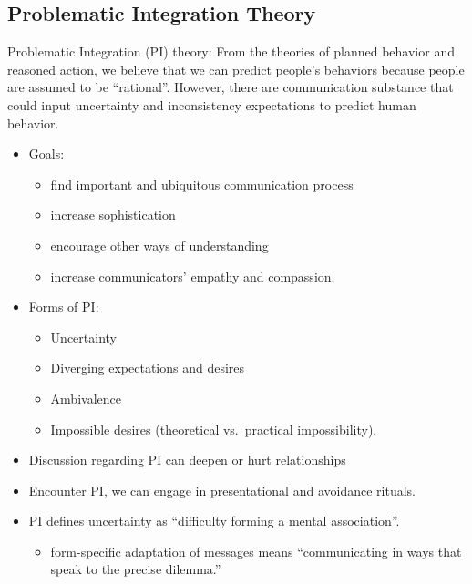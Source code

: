 \documentclass[
]{book}
\providecommand{\tightlist}{%
  \setlength{\itemsep}{0pt}\setlength{\parskip}{0pt}}
\begin{document}
\hypertarget{problematic-integration-theory}{%
\subsection{Problematic Integration Theory}\label{problematic-integration-theory}}

Problematic Integration (PI) theory: From the theories of planned behavior and reasoned action, we believe that we can predict people's behaviors because people are assumed to be ``rational''. However, there are communication substance that could input uncertainty and inconsistency expectations to predict human behavior.

\begin{itemize}
\item
  Goals:

  \begin{itemize}
  \tightlist
  \item
    find important and ubiquitous communication process\\
  \item
    increase sophistication\\
  \item
    encourage other ways of understanding\\
  \item
    increase communicators' empathy and compassion.\\
  \end{itemize}
\item
  Forms of PI:

  \begin{itemize}
  \tightlist
  \item
    Uncertainty\\
  \item
    Diverging expectations and desires\\
  \item
    Ambivalence\\
  \item
    Impossible desires (theoretical vs.~practical impossibility).\\
  \end{itemize}
\item
  Discussion regarding PI can deepen or hurt relationships\\
\item
  Encounter PI, we can engage in presentational and avoidance rituals.\\
\item
  PI defines uncertainty as ``difficulty forming a mental association''. \citep{Babrow_2009}

  \begin{itemize}
  \tightlist
  \item
    form-specific adaptation of messages means ``communicating in ways that speak to the precise dilemma.'' \citep{Babrow_2009}
  \end{itemize}
\end{itemize}
\end{document}
